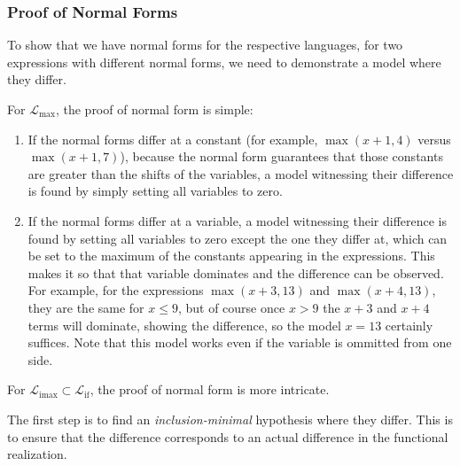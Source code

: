 \documentclass[11pt, twoside, reqno]{book}
\DeclareMathOperator{\imax}{imax}
\DeclareMathOperator{\ifop}{if}
\begin{document}
\subsubsection{Proof of Normal Forms}
To show that we have normal forms for the respective languages, for two expressions with different normal forms, we need to demonstrate a model where they differ.

For \(\mathcal{L}_{\max}\), the proof of normal form is simple:
\begin{enumerate}
\item
  If the normal forms differ at a constant (for example, \(\max(x+1, 4)\) versus \(\max(x+1, 7)\)), because the normal form guarantees that those constants are greater than the shifts of the variables, a model witnessing their difference is found by simply setting all variables to zero.
\item
  If the normal forms differ at a variable, a model witnessing their difference is found by setting all variables to zero except the one they differ at, which can be set to the maximum of the constants appearing in the expressions. This makes it so that that variable dominates and the difference can be observed.
  For example, for the expressions \(\max(x+3, 13)\) and \(\max(x+4, 13)\), they are the same for \(x \le 9\), but of course once \(x > 9\) the \(x+3\) and \(x+4\) terms will dominate, showing the difference, so the model \(x = 13\) certainly suffices.
  Note that this model works even if the variable is ommitted from one side.
\end{enumerate}

For \(\mathcal{L}_{\imax} \subset \mathcal{L}_{\ifop}\), the proof of normal form is more intricate.

The first step is to find an \emph{inclusion-minimal} hypothesis where they differ.
This is to ensure that the difference corresponds to an actual difference in the functional realization.
\end{document}
